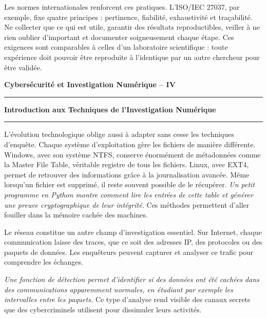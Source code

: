 \documentclass[12pt,a4paper]{article}
\newcommand{\HRule}{\rule{\linewidth}{1pt}}
\begin{document}
	\medskip
	\noindent
	Les normes internationales renforcent ces pratiques. L’ISO/IEC 27037, par exemple, fixe quatre principes : pertinence, fiabilité, exhaustivité et traçabilité. Ne collecter que ce qui est utile, garantir des résultats reproductibles, veiller à ne rien oublier d’important et documenter soigneusement chaque étape. Ces exigences sont comparables à celles d’un laboratoire scientifique : toute expérience doit pouvoir être reproduite à l’identique par un autre chercheur pour être validée.
	
	\vfill
	
	\begin{flushleft}
		\textbf{Cybersécurité et Investigation Numérique -- IV}
		\HRule 
	\end{flushleft}  
	
	\newpage 
	
	\begin{flushright}
		\textbf{Introduction aux Techniques de l'Investigation Numérique}
		\HRule
	\end{flushright}
	
	\vspace{0.5cm}
	
	\medskip
	\noindent
	L’évolution technologique oblige aussi à adapter sans cesse les techniques d’enquête. Chaque système d’exploitation gère les fichiers de manière différente. Windows, avec son système NTFS, conserve énormément de métadonnées comme la Master File Table, véritable registre de tous les fichiers. Linux, avec EXT4, permet de retrouver des informations grâce à la journalisation avancée. Même lorsqu’un fichier est supprimé, il reste souvent possible de le récupérer. \textit{Un petit programme en Python montre comment lire les entrées de cette table et générer une preuve cryptographique de leur intégrité.} Ces méthodes permettent d’aller fouiller dans la mémoire cachée des machines.
	
	\medskip
	\noindent
	Le réseau constitue un autre champ d’investigation essentiel. Sur Internet, chaque communication laisse des traces, que ce soit des adresses IP, des protocoles ou des paquets de données. Les enquêteurs peuvent capturer et analyser ce trafic pour comprendre les échanges.
	
	\noindent
	\textit{Une fonction de détection permet d’identifier si des données ont été cachées dans des communications apparemment normales, en étudiant par exemple les intervalles entre les paquets.}
	Ce type d’analyse rend visible des canaux secrets que des cybercriminels utilisent pour dissimuler leurs activités.
	
\end{document}
